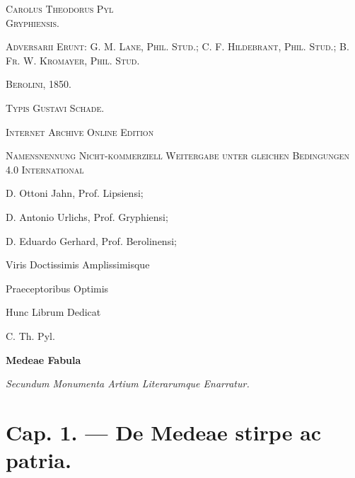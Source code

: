 \documentclass[a4paper, 11pt, oneside, polutonikogreek, german]{article}
\begin{document}
\begin{titlepage}
        {\scshape \Large Carolus Theodorus Pyl\\\normalsize Gryphiensis.} %

	\vspace*{1\baselineskip} %

        {\scshape \scriptsize Adversarii Erunt: G. M. Lane, Phil. Stud.; C. F. Hildebrant, Phil. Stud.; B. Fr. W. Kromayer, Phil. Stud.}
        \vspace*{\fill}

	\vspace{1\baselineskip}

	{\small\scshape Berolini, 1850.}
	
	{\small\scshape{Typis Gustavi Schade.}}
	
	\vspace{0.5\baselineskip} %

        \scshape Internet Archive Online Edition%
	
	{\scshape\small Namensnennung Nicht-kommerziell Weitergabe unter gleichen Bedingungen 4.0 International} %
\end{titlepage}
\setlength{\parskip}{1mm plus1mm minus1mm}
\clearpage
\Large
\tableofcontents
\clearpage
\vspace*{\fill}

D. Ottoni Jahn, Prof. Lipsiensi;

D. Antonio Urlichs, Prof. Gryphiensi;

D. Eduardo Gerhard, Prof. Berolinensi;

Viris Doctissimis Amplissimisque

Praeceptoribus Optimis

Hunc Librum Dedicat

C. Th. Pyl.
\vspace*{\fill}
\clearpage
\begin{center}
\textbf{Medeae Fabula}

\emph{Secundum Monumenta Artium Literarumque Enarratur.}
\end{center}
\section{Cap. 1. --- De Medeae stirpe ac patria.}
\end{document}
